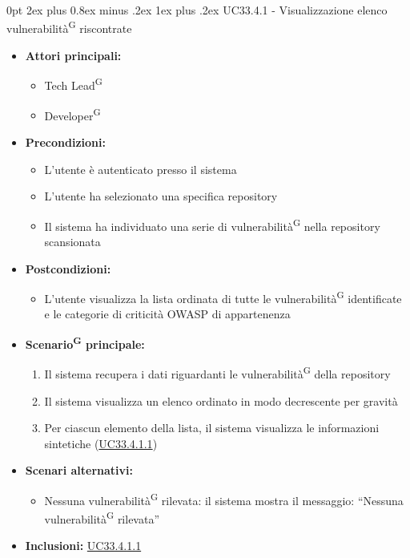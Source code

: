 \documentclass[a4paper, 11pt]{article}
\makeatletter
\renewcommand\subparagraph{\@startsection{subparagraph}{5}
  {0pt}
  {2ex plus 0.8ex minus .2ex}
  {1ex plus .2ex}
  {\normalfont\normalsize\bfseries\color{AccentColor}}}
\makeatother
\begin{document}
\subparagraph{UC33.4.1 - Visualizzazione elenco vulnerabilità\textsuperscript{G} riscontrate}\label{UC33.4.1}
\begin{itemize}
    \item \textbf{Attori principali:}
    \begin{itemize}
        \item Tech Lead\textsuperscript{G}
        \item Developer\textsuperscript{G}
    \end{itemize}
    \item \textbf{Precondizioni:} 
    \begin{itemize}
        \item L'utente è autenticato presso il sistema
        \item L’utente ha selezionato una specifica repository
        \item Il sistema ha individuato una serie di vulnerabilità\textsuperscript{G} nella repository scansionata
    \end{itemize}
    \item \textbf{Postcondizioni:} 
    \begin{itemize}
        \item L'utente visualizza la lista ordinata di tutte le vulnerabilità\textsuperscript{G} identificate e le categorie di criticità OWASP di appartenenza
    \end{itemize}
    \item \textbf{Scenario\textsuperscript{G} principale:}
    \begin{enumerate}
        \item Il sistema recupera i dati riguardanti le vulnerabilità\textsuperscript{G} della repository
        \item Il sistema visualizza un elenco ordinato in modo decrescente per gravità         
        \item Per ciascun elemento della lista, il sistema visualizza le informazioni sintetiche (\hyperref[UC33.4.1.1]{UC33.4.1.1})
    \end{enumerate}
    \item \textbf{Scenari alternativi:}
    \begin{itemize}
        \item Nessuna vulnerabilità\textsuperscript{G} rilevata: il sistema mostra il messaggio: ``Nessuna vulnerabilità\textsuperscript{G} rilevata''
    \end{itemize}
    \item \textbf{Inclusioni:} \hyperref[UC33.4.1.1]{UC33.4.1.1}
\end{itemize}
\end{document}
